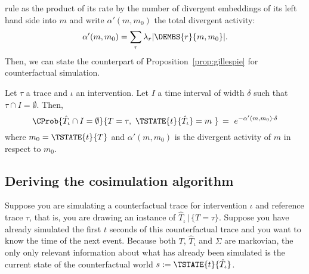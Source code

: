 rule as the product of its rate by the number of divergent embeddings
of its left hand side into $m$ and write $\alpha'(m, m_0)$ the total
divergent activity:
\[\alpha'(m, m_0) = \sum_r \lambda_r |\DEMBS{r}{m, m_0}|. \]
Then, we can state the counterpart of Proposition~\ref{prop:gillespie}
for counterfactual simulation.
\begin{proposition}\label{prop:cosim-waiting}
  Let $\tau$ a trace and $\iota$ an intervention.  Let $I$ a time
  interval of width $\delta$ such that $\tau \cap I =
  \emptyset$. Then,
  \[
    \CProb{ \hat T_\iota \cap I = \emptyset } { T=\tau,\
      \TSTATE{t}{\hat T_\iota} = m\ } \,=\ e^{-\alpha'(m, m_0) \cdot
      \delta}
  \]
  where $m_0 = \TSTATE{t}{T}$ and $\alpha'(m, m_0)$ is the divergent
  activity of $m$ in respect to $m_0$.
\end{proposition}


 




\subsection{Deriving the cosimulation algorithm}

Suppose you are simulating a counterfactual trace for intervention
$\iota$ and reference trace $\tau$, that is, you are drawing an
instance of $\hat T_\iota \,|\, \{T=\tau\}$. Suppose you have already
simulated the first $t$ seconds of this counterfactual trace and you
want to know the time of the next event. Because both $T$,
$\hat T_\iota$ and $\Sigma$ are markovian, the only only relevant
information about what has already been simulated is the current state
of the counterfactual world $s := \TSTATE{t}{\hat T_\iota}$.



